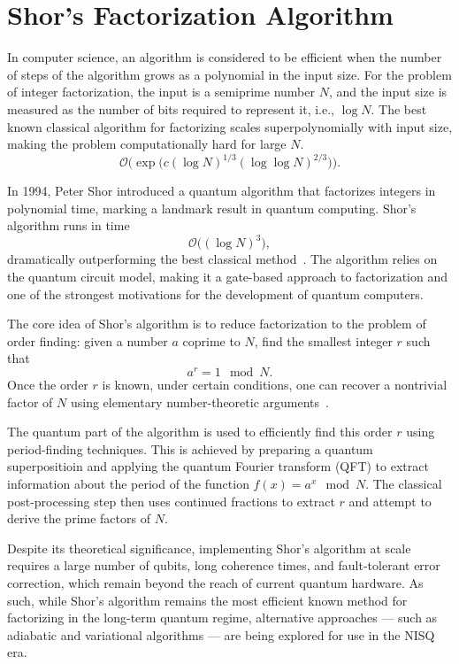 \section{Shor's Factorization Algorithm}

In computer science, an algorithm is considered to be efficient when the number of steps
of the algorithm grows as a polynomial in the input size. For the problem of integer factorization,
the input is a semiprime number $N$, and the input size is measured as the number of bits
required to represent it, i.e., $\log N$. The best known classical algorithm for factorizing
scales superpolynomially with input size, making the problem computationally hard for large $N$.
\begin{equation}
    \mathcal{O} \bigg( \exp \big( c(\log N)^{1/3} (\log \log N)^{2/3} \big) \bigg).
    \label{eq:field_sieve_scaling}
\end{equation}

In 1994, Peter Shor introduced a quantum algorithm that factorizes integers in polynomial time,
marking a landmark result in quantum computing. Shor's algorithm runs in time
\begin{equation}
    \mathcal{O} \big( (\log N)^3 \big),
    \label{eq:shor_scaling}
\end{equation}
dramatically outperforming the best classical method~\cite{nielsen00}. The algorithm relies on the quantum
circuit model, making it a gate-based approach to factorization and one of the strongest motivations
for the development of quantum computers.

The core idea of Shor's algorithm is to reduce factorization to the problem of order finding:
given a number $a$ coprime to $N$, find the smallest integer $r$ such that
\begin{equation}
    a^r = 1 \mod N.
    \label{eq:order_finding}
\end{equation}
Once the order $r$ is known, under certain conditions, one can recover a nontrivial factor of
$N$ using elementary number-theoretic arguments~\cite{nielsen00}.

The quantum part of the algorithm is used to efficiently find this order $r$ using
period-finding techniques. This is achieved by preparing a quantum superpositioin and applying the
quantum Fourier transform (QFT) to extract information about the period of the function
$f(x) = a^x \mod N$. The classical post-processing step then uses continued fractions to extract $r$
and attempt to derive the prime factors of $N$.

Despite its theoretical significance, implementing Shor's algorithm at scale requires a
large number of qubits, long coherence times, and fault-tolerant error correction,
which remain beyond the reach of current quantum hardware. As such, while Shor's algorithm remains
the most efficient known method for factorizing in the long-term quantum regime, alternative approaches
--- such as adiabatic and variational algorithms --- are being explored for use in the NISQ era.